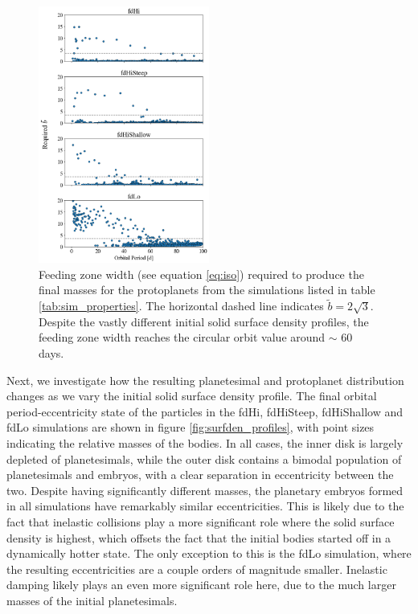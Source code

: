 \documentclass[twocolumn]{aastex63}
\begin{document}
\begin{figure}
\begin{center}
    \includegraphics[width=0.5\textwidth]{figures/surfden_b.png}
    \caption{Feeding zone width (see equation \ref{eq:iso}) required to produce the final masses for the protoplanets from the 
    simulations listed in table \ref{tab:sim_properties}. The horizontal dashed line indicates $\tilde{b} = 2 \sqrt{3}$. Despite the 
    vastly different initial solid surface density profiles, the feeding zone width reaches the circular orbit value around $\sim$ 60 
    days. \label{fig:surfden_b}}
\end{center}
\end{figure}

Next, we investigate how the resulting planetesimal and protoplanet distribution
changes as we vary the initial solid surface density profile.
The final orbital period-eccentricity state of the
particles in the fdHi, fdHiSteep, fdHiShallow and fdLo simulations are shown in figure \ref{fig:surfden_profiles}, with point sizes 
indicating the relative masses of the bodies. In all cases, the inner disk is largely depleted of planetesimals, while the outer disk 
contains a bimodal population of planetesimals and embryos, with a clear separation in eccentricity between the two. Despite 
having significantly different masses, the planetary embryos formed in all simulations have remarkably similar eccentricities. This 
is likely due to the fact that inelastic collisions play a more significant role where the solid surface density is highest, which 
offsets the fact that the initial bodies started off in a dynamically hotter state. The only exception to this is the fdLo simulation, 
where the resulting eccentricities are a couple orders of magnitude smaller. Inelastic damping likely plays an even more 
significant role here, due to the much larger masses of the initial planetesimals.
\end{document}
